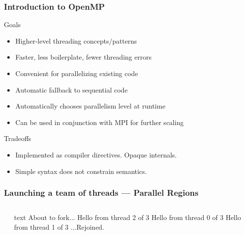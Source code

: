 \documentclass[]{beamer}
\begin{document}
\begin{frame}
  \frametitle{Introduction to OpenMP}

  \begin{block}{Goals}
    \begin{itemize}
    \item Higher-level threading concepts/patterns
    \item Faster, less boilerplate, fewer threading errors
    \item Convenient for parallelizing existing code
    \item Automatic fallback to sequential code
    \item Automatically chooses parallelism level at runtime
    \item Can be used in conjunction with MPI for further scaling
    \end{itemize}
  \end{block}

  \begin{block}{Tradeoffs}
    \begin{itemize}
    \item Implemented as compiler directives. Opaque internals.
    \item Simple syntax does not constrain semantics.
    \end{itemize}
  \end{block}

\end{frame}


\begin{frame}[fragile]
  \frametitle{Launching a team of threads --- Parallel Regions}
  \begin{columns}[t]%
    \begin{column}{0.65\textwidth}
    \end{column}
    \begin{column}{0.4\textwidth}
      \begin{ccode}[]
        {text}
        About to fork...
        Hello from thread 2 of 3
        Hello from thread 0 of 3
        Hello from thread 1 of 3
        ...Rejoined.
      \end{ccode}
    \end{column}
  \end{columns}
\end{frame}
\end{document}
